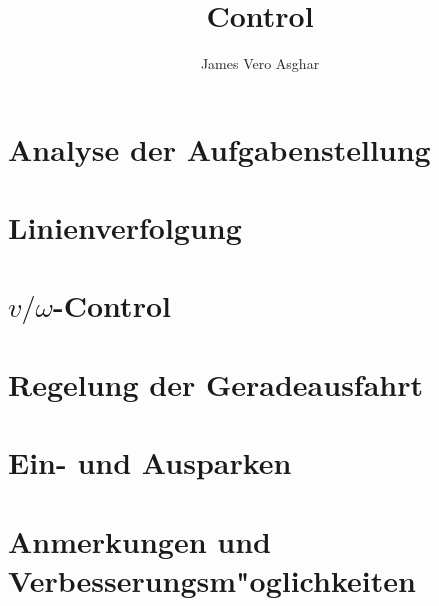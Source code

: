 \documentclass{tudscrartcl}
\title{Control}
\author{James Vero Asghar}
\begin{document}
    \maketitle
    \newpage

\section{Analyse der Aufgabenstellung}
    

\section{Linienverfolgung}
    

\section{\(v/\omega\)-Control}
    

\section{Regelung der Geradeausfahrt}
    

\section{Ein- und Ausparken}
    

\section{Anmerkungen und Verbesserungsm"oglichkeiten}
    
\end{document}
